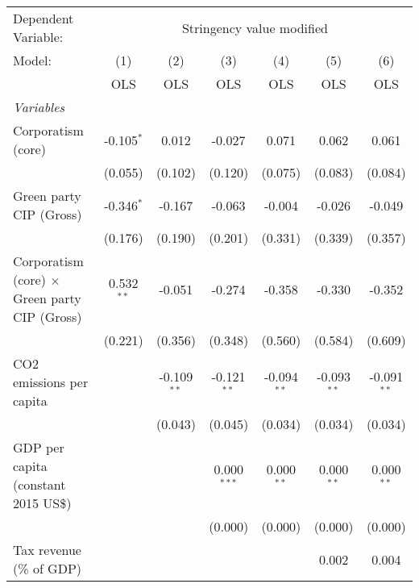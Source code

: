 
\begingroup
\centering
\begin{tabular}{lcccccc}
   \toprule
   Dependent Variable: & \multicolumn{6}{c}{Stringency value modified}\\
   Model:                                               & (1)          & (2)           & (3)           & (4)           & (5)           & (6)\\  
                                                        &  OLS         & OLS           & OLS           & OLS           & OLS           & OLS\\  
   \midrule
   \emph{Variables}\\
   Corporatism (core)                                   & -0.105$^{*}$ & 0.012         & -0.027        & 0.071         & 0.062         & 0.061\\   
                                                        & (0.055)      & (0.102)       & (0.120)       & (0.075)       & (0.083)       & (0.084)\\   
   Green party CIP (Gross)                              & -0.346$^{*}$ & -0.167        & -0.063        & -0.004        & -0.026        & -0.049\\   
                                                        & (0.176)      & (0.190)       & (0.201)       & (0.331)       & (0.339)       & (0.357)\\   
   Corporatism (core) $\times$ Green party CIP (Gross)  & 0.532$^{**}$ & -0.051        & -0.274        & -0.358        & -0.330        & -0.352\\   
                                                        & (0.221)      & (0.356)       & (0.348)       & (0.560)       & (0.584)       & (0.609)\\   
   CO2 emissions per capita                             &              & -0.109$^{**}$ & -0.121$^{**}$ & -0.094$^{**}$ & -0.093$^{**}$ & -0.091$^{**}$\\   
                                                        &              & (0.043)       & (0.045)       & (0.034)       & (0.034)       & (0.034)\\   
   GDP per capita (constant 2015 US\$)                  &              &               & 0.000$^{***}$ & 0.000$^{**}$  & 0.000$^{**}$  & 0.000$^{**}$\\   
                                                        &              &               & (0.000)       & (0.000)       & (0.000)       & (0.000)\\   
   Tax revenue (\% of GDP)                              &              &               &               &               & 0.002         & 0.004\\   

\end{tabular}

